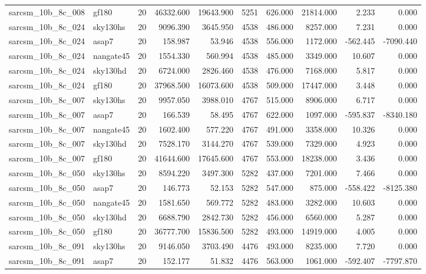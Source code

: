 \documentclass{article}
\begin{document}
\begin{longtable}{llrrrrrrrr}
sarcsm\_10b\_8c\_008 & gf180 & 20 & 46332.600 & 19643.900 & 5251 & 626.000 & 21814.000 & 2.233 & 0.000 \\
sarcsm\_10b\_8c\_024 & sky130hs & 20 & 9096.390 & 3645.950 & 4538 & 486.000 & 8257.000 & 7.231 & 0.000 \\
sarcsm\_10b\_8c\_024 & asap7 & 20 & 158.987 & 53.946 & 4538 & 556.000 & 1172.000 & -562.445 & -7090.440 \\
sarcsm\_10b\_8c\_024 & nangate45 & 20 & 1554.330 & 560.994 & 4538 & 485.000 & 3349.000 & 10.607 & 0.000 \\
sarcsm\_10b\_8c\_024 & sky130hd & 20 & 6724.000 & 2826.460 & 4538 & 476.000 & 7168.000 & 5.817 & 0.000 \\
sarcsm\_10b\_8c\_024 & gf180 & 20 & 37968.500 & 16073.600 & 4538 & 509.000 & 17447.000 & 3.448 & 0.000 \\
sarcsm\_10b\_8c\_007 & sky130hs & 20 & 9957.050 & 3988.010 & 4767 & 515.000 & 8906.000 & 6.717 & 0.000 \\
sarcsm\_10b\_8c\_007 & asap7 & 20 & 166.539 & 58.495 & 4767 & 622.000 & 1097.000 & -595.837 & -8340.180 \\
sarcsm\_10b\_8c\_007 & nangate45 & 20 & 1602.400 & 577.220 & 4767 & 491.000 & 3358.000 & 10.326 & 0.000 \\
sarcsm\_10b\_8c\_007 & sky130hd & 20 & 7528.170 & 3144.270 & 4767 & 539.000 & 7329.000 & 4.923 & 0.000 \\
sarcsm\_10b\_8c\_007 & gf180 & 20 & 41644.600 & 17645.600 & 4767 & 553.000 & 18238.000 & 3.436 & 0.000 \\
sarcsm\_10b\_8c\_050 & sky130hs & 20 & 8594.220 & 3497.300 & 5282 & 437.000 & 7201.000 & 7.466 & 0.000 \\
sarcsm\_10b\_8c\_050 & asap7 & 20 & 146.773 & 52.153 & 5282 & 547.000 & 875.000 & -558.422 & -8125.380 \\
sarcsm\_10b\_8c\_050 & nangate45 & 20 & 1581.650 & 569.772 & 5282 & 483.000 & 3282.000 & 10.603 & 0.000 \\
sarcsm\_10b\_8c\_050 & sky130hd & 20 & 6688.790 & 2842.730 & 5282 & 456.000 & 6560.000 & 5.287 & 0.000 \\
sarcsm\_10b\_8c\_050 & gf180 & 20 & 36777.700 & 15836.500 & 5282 & 493.000 & 14919.000 & 4.005 & 0.000 \\
sarcsm\_10b\_8c\_091 & sky130hs & 20 & 9146.050 & 3703.490 & 4476 & 493.000 & 8235.000 & 7.720 & 0.000 \\
sarcsm\_10b\_8c\_091 & asap7 & 20 & 152.177 & 51.832 & 4476 & 563.000 & 1061.000 & -592.407 & -7797.870 \\

\end{longtable}
\end{document}
